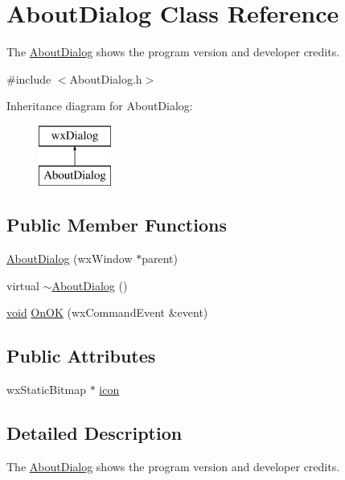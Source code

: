 \hypertarget{class_about_dialog}{}\section{About\+Dialog Class Reference}
\label{class_about_dialog}


The \hyperlink{class_about_dialog}{About\+Dialog} shows the program version and developer credits.  




{\ttfamily \#include $<$About\+Dialog.\+h$>$}

Inheritance diagram for About\+Dialog\+:\begin{figure}[H]
\begin{center}
\leavevmode
\includegraphics[height=2.000000cm]{class_about_dialog}
\end{center}
\end{figure}
\subsection*{Public Member Functions}
\begin{DoxyCompactItemize}
\item 
\hyperlink{class_about_dialog_aa0981cccc91eaacb8422aabdecd94228}{About\+Dialog} (wx\+Window $\ast$parent)
\item 
virtual \hyperlink{class_about_dialog_a3d87f5a26a175bb2573965c98af6d4ca}{$\sim$\+About\+Dialog} ()
\item 
\hyperlink{sound_8c_ae35f5844602719cf66324f4de2a658b3}{void} \hyperlink{class_about_dialog_a47142fb5e89c5217c910e13f30c290a1}{On\+OK} (wx\+Command\+Event \&event)
\end{DoxyCompactItemize}
\subsection*{Public Attributes}
\begin{DoxyCompactItemize}
\item 
wx\+Static\+Bitmap $\ast$ \hyperlink{class_about_dialog_a52f197086a20fe4b9a4f875984be2ea2}{icon}
\end{DoxyCompactItemize}


\subsection{Detailed Description}
The \hyperlink{class_about_dialog}{About\+Dialog} shows the program version and developer credits. 

